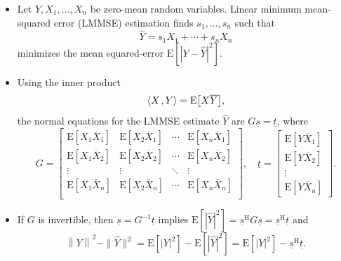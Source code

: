 \documentclass[11pt,twoside]{report}
\newcommand{\vecnot}{\underline}
\newcommand{\Herm}{{\mathrm{H}}}
\newcommand{\inner}[2]{{\left\langle #1 \mskip2mu , #2 \right\rangle}}
\newcommand{\Expect}{\ensuremath{\mathrm{E}}}
\begin{document}
\begin{itemize}
\item  Let $Y, X_1, \ldots, X_n$ be zero-mean random variables.
Linear minimum mean-squared error (LMMSE) estimation finds $s_1, \ldots, s_n$ such that
\[ \hat{Y} = s_1 X_1 + \cdots + s_n X_n \]
minimizes the mean squared-error $\Expect[|Y-\hat{Y}|^2]$.
\item Using the inner product
\begin{equation*}
\inner{ X }{ Y } = \Expect \left[ X \overline{Y} \right],
\end{equation*}
the normal equations for the LMMSE estimate $\hat{Y}$ are $G \vecnot{s} = \vecnot{t}$, where
\begin{equation*}
G = \left[ \begin{array}{cccc}
\Expect \left[ X_1 \overline{X}_1 \right]
& \Expect \left[ X_2 \overline{X}_1 \right] & \cdots
& \Expect \left[ X_n \overline{X}_1 \right] \\
\Expect \left[ X_1 \overline{X}_2 \right]
& \Expect \left[ X_2 \overline{X}_2 \right] & \cdots
& \Expect \left[ X_n \overline{X}_2 \right] \\
\vdots & \vdots & \ddots & \vdots \\
\Expect \left[ X_1 \overline{X}_n \right]
& \Expect \left[ X_2 \overline{X}_n \right] & \cdots
& \Expect \left[ X_n \overline{X}_n \right] \\
\end{array} \right], \quad \vecnot{t} = \left[ \begin{array}{c}
\Expect \left[ Y \overline{X}_1 \right] \\
\Expect \left[ Y \overline{X}_2 \right] \\ \vdots \\
\Expect \left[ Y \overline{X}_n \right] \end{array} \right].
\end{equation*}

\item If $G$ is invertible, then $\vecnot{s} = G^{-1} \vecnot{t}$ implies $\Expect [|\hat{Y}|^2] = \vecnot{s}^\Herm G \vecnot{s} = \vecnot{s}^\Herm \vecnot{t}$ and
\begin{equation*}
\left\| Y \right\|^2 -\| \hat{Y} \|^2 
= \Expect[ |Y|^2 ]
- \Expect[ |\hat{Y}|^2 ] = \Expect \left[ |Y|^2 \right] - \vecnot{s}^\Herm \vecnot{t}.
\end{equation*}

\end{itemize}
\end{document}
